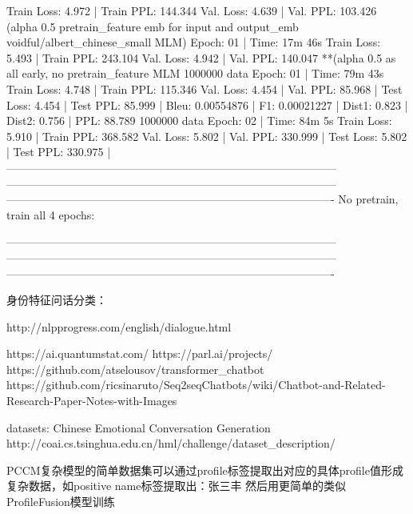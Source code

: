 \documentclass[letterpaper]{article} %
\begin{document}
\begin{CJK*}{UTF8}{gbsn}
	Train Loss: 4.972 | Train PPL: 144.344
	 Val. Loss: 4.639 |  Val. PPL: 103.426
(alpha 0.5 pretrain_feature emb for input and output_emb voidful/albert_chinese_small MLM)
Epoch: 01 | Time: 17m 46s
	Train Loss: 5.493 | Train PPL: 243.104
	 Val. Loss: 4.942 |  Val. PPL: 140.047
**(alpha 0.5 as all early, no pretrain_feature MLM %
1000000 data
Epoch: 01 | Time: 79m 43s
	Train Loss: 4.748 | Train PPL: 115.346
	 Val. Loss: 4.454 |  Val. PPL:  85.968
| Test Loss: 4.454 | Test PPL:  85.999 |
Bleu: 0.00554876 | F1: 0.00021227 | Dist1: 0.823 | Dist2: 0.756 | PPL:  88.789
1000000 data
Epoch: 02 | Time: 84m 5s
	Train Loss: 5.910 | Train PPL: 368.582
	 Val. Loss: 5.802 |  Val. PPL: 330.999
| Test Loss: 5.802 | Test PPL: 330.975 |
-----------------------------------------------------------------------------------------
-----------------------------------------------------------------------------------------
----------------------------------------------------------------------------------------
No pretrain, train all 4 epochs:

-----------------------------------------------------------------------------------------
-----------------------------------------------------------------------------------------
----------------------------------------------------------------------------------------



身份特征问话分类：


http://nlpprogress.com/english/dialogue.html

https://ai.quantumstat.com/
https://parl.ai/projects/
https://github.com/atselousov/transformer\_chatbot
https://github.com/ricsinaruto/Seq2seqChatbots/wiki/Chatbot-and-Related-Research-Paper-Notes-with-Images


datasets:
Chinese Emotional Conversation Generation
http://coai.cs.tsinghua.edu.cn/hml/challenge/dataset\_description/


PCCM复杂模型的简单数据集可以通过profile标签提取出对应的具体profile值形成复杂数据，如positive name标签提取出：张三丰
然后用更简单的类似ProfileFusion模型训练

\clearpage\end{CJK*}
\end{document}
